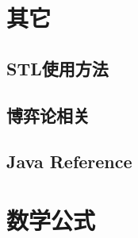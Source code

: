 \documentclass[openany, a4paper, 10pt]{book}
\begin{document}
\begin{spacing}{1.0}
	\chapter{其它}
		\section{STL使用方法}
			
		\section{博弈论相关}
			
		\section{Java Reference}
			
	\chapter{数学公式}
		
	\end{spacing}
\end{document}
